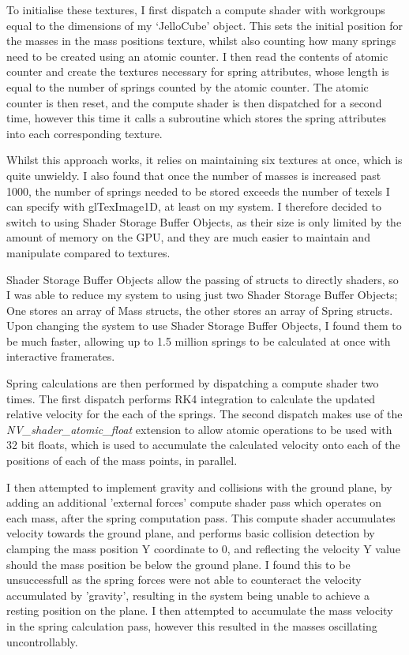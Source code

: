 \documentclass[]{acmsiggraph}
\begin{document}
To initialise these textures, I first dispatch a compute shader with workgroups equal to the dimensions of my ‘JelloCube’ object. This sets the initial position for the masses in the mass positions texture, whilst also counting how many springs need to be created using an atomic counter. I then read the contents of atomic counter and create the textures necessary for spring attributes, whose length is equal to the number of springs counted by the atomic counter. The atomic counter is then reset, and the compute shader is then dispatched for a second time, however this time it calls a subroutine which stores the spring attributes into each corresponding texture.

Whilst this approach works, it relies on maintaining six textures at once, which is quite unwieldy. I also found that once the number of masses is increased past 1000, the number of springs needed to be stored exceeds the number of texels I can specify with glTexImage1D, at least on my system. I therefore decided to switch to using Shader Storage Buffer Objects, as their size is only limited by the amount of memory on the GPU, and they are much easier to maintain and manipulate compared to textures.

Shader Storage Buffer Objects allow the passing of structs to directly shaders, so I was able to reduce my system to using just two Shader Storage Buffer Objects; One stores an array of Mass structs, the other stores an array of Spring structs. Upon changing the system to use Shader Storage Buffer Objects, I found them to be much faster, allowing up to 1.5 million springs to be calculated at once with interactive framerates.

Spring calculations are then performed by dispatching a compute shader two times. The first dispatch performs RK4 integration to calculate the updated relative velocity for the each of the springs. The second dispatch makes use of the \textit{NV_shader_atomic_float} extension to allow atomic operations to be used with 32 bit floats, which is used to accumulate the calculated velocity onto each of the positions of each of the mass points, in parallel.

I then attempted to implement gravity and collisions with the ground plane, by adding an additional 'external forces' compute shader pass which operates on each mass, after the spring computation pass. This compute shader accumulates velocity towards the ground plane, and performs basic collision detection by clamping the mass position Y coordinate to 0, and reflecting the velocity Y value should the mass position be below the ground plane. I found this to be unsuccessfull as the spring forces were not able to counteract the velocity accumulated by 'gravity', resulting in the system being unable to achieve a resting position on the plane. I then attempted to accumulate the mass velocity in the spring calculation pass, however this resulted in the masses oscillating uncontrollably.
\end{document}
